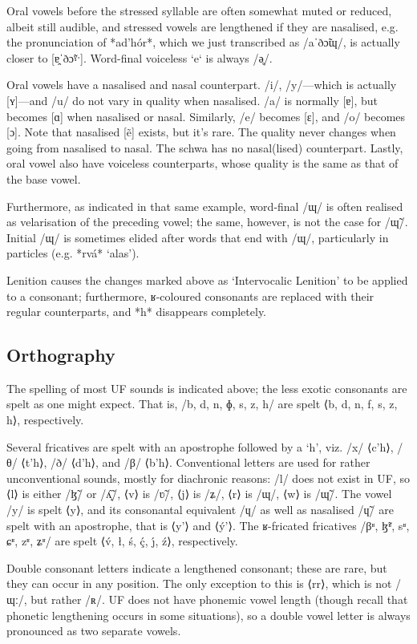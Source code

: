 \documentclass[a4paper, 12pt, oneside, final]{article}
\begin{document}
Oral vowels before the stressed syllable are often somewhat muted or reduced, albeit still audible, and stressed vowels are lengthened if they
are nasalised, e.g. the pronunciation of *ad’hór*, which we just transcribed as /aˈðɔ̃ɰ/, is actually closer to [ɐ̯ˈðɔ̃ˠˑ].
Word-final voiceless `e` is always /ə̥/.

Oral vowels have a nasalised and nasal counterpart. /i/, /y/—which is actually [ʏ]—and /u/ do not vary in quality when nasalised. /a/ is normally [ɐ],
but becomes [ɑ] when nasalised or nasal. Similarly, /e/ becomes [ɛ], and /o/ becomes [ɔ]. Note that nasalised [ẽ] exists, but it’s
rare. The quality never changes when going from nasalised to nasal. The schwa has no nasal(lised) counterpart. Lastly, oral vowel
also have voiceless counterparts, whose quality is the same as that of the base vowel.

Furthermore, as indicated in that same example, word-final /ɰ/ is often realised as velarisation of the preceding vowel;
the same, however, is not the case for /ɰ̃/. Initial /ɰ/ is sometimes elided after words that end with /ɰ/, particularly
in particles (e.g. *rvá* ‘alas’).

Lenition causes the changes marked above as ‘Intervocalic Lenition’ to be applied to a consonant; furthermore,
ʁ-coloured consonants are replaced with their regular counterparts, and *h* disappears completely.

\subsection{Orthography}
The spelling of most UF sounds is indicated above; the less exotic consonants are spelt as
one might expect. That is, /b, d, n, ɸ, s, z, h/ are spelt ⟨b, d, n, f, s, z, h⟩, respectively.

Several fricatives are spelt with an apostrophe followed by a ‘h’, viz. /x/ ⟨c’h⟩, /θ/ ⟨t’h⟩, /ð/ ⟨d’h⟩,
and /β/ ⟨b’h⟩. Conventional letters are used for rather unconventional sounds, mostly for diachronic reasons:
/l/ does not exist in UF, so ⟨l⟩ is either /ɮ̃/ or /ʎ̝̃/, ⟨v⟩ is /ʋ̃/, ⟨j⟩ is /ʑ/, ⟨r⟩ is /ɰ/, ⟨w⟩ is /ɰ̃/. The vowel
/y/ is spelt ⟨y⟩, and its consonantal equivalent /ɥ/ as well as nasalised /ɥ̃/ are spelt with an apostrophe, that is
⟨y’⟩ and ⟨ý’⟩. The ʁ-fricated fricatives /βʶ, ɮ̃ʶ, sʶ, ɕʶ, zʶ, ʑʶ/
are spelt ⟨v́, ł, ś, ḉ, ȷ́, ź⟩, respectively.

Double consonant letters indicate a lengthened consonant; these are rare, but they can occur in any position. The only
exception to this is ⟨rr⟩, which is not /ɰː/, but rather /ʀ/. UF does not have phonemic vowel length (though recall
that phonetic lengthening occurs in some situations), so a double vowel letter is always pronounced as two separate vowels.
\end{document}
